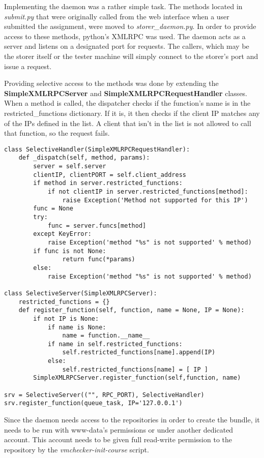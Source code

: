 Implementing the daemon was a rather simple task. The methods located in 
\textit{submit.py} that were originally called from the web interface when
a user submitted the assignment, were moved to \textit{storer_daemon.py}.
In order to provide access to these methods, python's XMLRPC was used.
The daemon acts as a server and listens on a designated port for requests.
The callers, which may be the storer itself or the tester machine will
simply connect to the storer's port and issue a request.

Providing selective access to the methods was done by extending the
\textbf{SimpleXMLRPCServer} and \textbf{SimpleXMLRPCRequestHandler} classes.
When a method is called, the dispatcher checks if the function's name is 
in the restricted_functions dictionary. If it is, it then checks if the
client IP matches any of the IPs defined in the list. A client that isn't
in the list is not allowed to call that function, so the request fails.


\lstset{caption=SelectiveServer implementation, language=python, label=lst:selective-srv}
\begin{lstlisting}
class SelectiveHandler(SimpleXMLRPCRequestHandler):
    def _dispatch(self, method, params):
        server = self.server
        clientIP, clientPORT = self.client_address
        if method in server.restricted_functions:
            if not clientIP in server.restricted_functions[method]:
                raise Exception('Method not supported for this IP')
        func = None
        try:
            func = server.funcs[method]
        except KeyError:
            raise Exception('method "%s" is not supported' % method)
        if func is not None:
                return func(*params)
        else:
            raise Exception('method "%s" is not supported' % method)            
        
class SelectiveServer(SimpleXMLRPCServer):
    restricted_functions = {}
    def register_function(self, function, name = None, IP = None):
        if not IP is None:
            if name is None:
                name = function.__name__
            if name in self.restricted_functions:
                self.restricted_functions[name].append(IP)
            else:
                self.restricted_functions[name] = [ IP ]
        SimpleXMLRPCServer.register_function(self,function, name)
        
srv = SelectiveServer(("", RPC_PORT), SelectiveHandler)
srv.register_function(queue_task, IP='127.0.0.1')
\end{lstlisting}

Since the daemon needs access to the repositories in order to create the bundle,
it needs to be run with www-data's permissions or under another dedicated account.
This account needs to be given full read-write permission to the repository
by the \textit{vmchecker-init-course} script.



